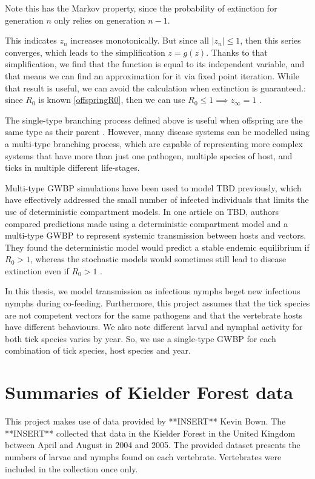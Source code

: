 \documentclass{article}
\begin{document}
Note this has the Markov property, since the probability of extinction for generation $ n $ only relies on generation $ n-1 $.

This indicates $ z_n $ increases monotonically. But since all $ |z_n| \le 1 $, then this series converges, which leads to the simplification $ z = g(z) $. Thanks to that simplification, we find that the function is equal to its independent variable, and that means we can find an approximation for it via fixed point iteration. While that result is useful, we can avoid the calculation when extinction is guaranteed.: since $ R_0 $ is known \eqref{offspringR0}, then we can use $ R_0 \le 1 \implies z_{\infty} = 1 $ \cite{Diekman2000}.

The single-type branching process defined above is useful when offspring are the same type as their parent \cite{Allen2019}. However, many disease systems can be modelled using a multi-type branching process, which are capable of representing more complex systems that have more than just one pathogen, multiple species of host, and ticks in multiple different life-stages.

Multi-type GWBP simulations have been used to model TBD previously, which have effectively addressed the small number of infected individuals that limits the use of deterministic compartment models. In one article on TBD, authors compared predictions made using a deterministic compartment model and a multi-type GWBP to represent systemic transmission between hosts and vectors. They found the deterministic model would predict a stable endemic equilibrium if $ R_0 > 1 $, whereas the stochastic models would sometimes still lead to disease extinction even if $ R_0 > 1 $ \cite{Maliyoni_2017}. 

In this thesis, we model transmission as infectious nymphs beget new infectious nymphs during co-feeding. Furthermore, this project assumes that the tick species are not competent vectors for the same pathogens and that the vertebrate hosts have different behaviours. We also note different larval and nymphal activity for both tick species varies by year. So, we use a single-type GWBP for each combination of tick species, host species and year.

\newpage

\section{Summaries of Kielder Forest data}

This project makes use of data provided by **INSERT** Kevin Bown. The **INSERT** collected that data in the Kielder Forest in the United Kingdom between April and August in 2004 and 2005. The provided dataset presents the numbers of larvae and nymphs found on each vertebrate. Vertebrates were included in the collection once only.
\end{document}
